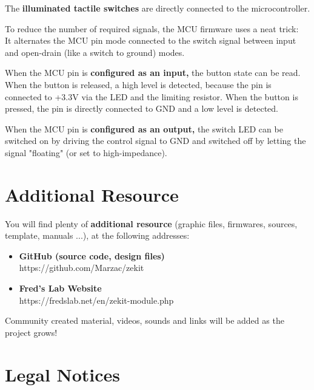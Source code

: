\documentclass{scrartcl}
\begin{document}
The \textbf{illuminated tactile switches} are directly connected to the microcontroller.

To reduce the number of required signals, the MCU firmware uses a neat trick: \\
It alternates the MCU pin mode connected to the switch signal between input and open-drain (like a switch to ground) modes.

When the MCU pin is \textbf{configured as an input,} the button state can be read.
When the button is released, a high level is detected, because the pin is connected to +3.3V via the LED and the limiting resistor.
When the button is pressed, the pin is directly connected to GND and a low level is detected.

When the MCU pin is \textbf{configured as an output,} the switch LED can be switched on by driving the control signal to GND and switched off by letting the signal "floating" (or set to high-impedance).

\pagebreak
\section{Additional Resource}
You will find plenty of \textbf{additional resource} (graphic files, firmwares, sources, template, manuals ...), at the following addresses:

\vspace{0.25cm}
\begin{itemize}
    \item \textbf{GitHub (source code, design files)} \\
    https://github.com/Marzac/zekit
    \vspace{0.25cm}
    \item \textbf{Fred's Lab Website} \\
    https://fredslab.net/en/zekit-module.php
\end{itemize}

\vspace{0.25cm}
Community created material, videos, sounds and links will be added as the project grows!


\section{Legal Notices}
\end{document}
